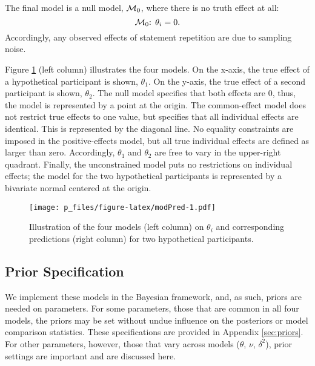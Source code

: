 \documentclass[
  english,
  ,man,floatsintext]{apa6}
\begin{document}
The final model is a null model, \({\cal M}_0\), where there is no truth effect at all:
\begin{equation}
 {\cal M}_{0}\text{: }\theta_i = 0.
\end{equation}
Accordingly, any observed effects of statement repetition are due to sampling noise.

Figure \ref{fig:modPred} (left column) illustrates the four models. On the x-axis, the true effect of a hypothetical participant is shown, \(\theta_1\). On the y-axis, the true effect of a second participant is shown, \(\theta_2\). The null model specifies that both effects are 0, thus, the model is represented by a point at the origin. The common-effect model does not restrict true effects to one value, but specifies that all individual effects are identical. This is represented by the diagonal line. No equality constraints are imposed in the positive-effects model, but all true individual effects are defined as larger than zero. Accordingly, \(\theta_1\) and \(\theta_2\) are free to vary in the upper-right quadrant. Finally, the unconstrained model puts no restrictions on individual effects; the model for the two hypothetical participants is represented by a bivariate normal centered at the origin.

\begin{figure}
\centering
\texttt{[image: p\_files/figure-latex/modPred-1.pdf]}
\caption{\label{fig:modPred}Illustration of the four models (left column) on \(\theta_i\) and corresponding predictions (right column) for two hypothetical participants.}
\end{figure}

\hypertarget{prior-specification}{%
\subsection{Prior Specification}\label{prior-specification}}

We implement these models in the Bayesian framework, and, as such, priors are needed on parameters. For some parameters, those that are common in all four models, the priors may be set without undue influence on the posteriors or model comparison statistics. These specifications are provided in Appendix \ref{sec:priors}. For other parameters, however, those that vary across models (\(\theta\), \(\nu\), \(\delta^2\)), prior settings are important and are discussed here.
\end{document}
